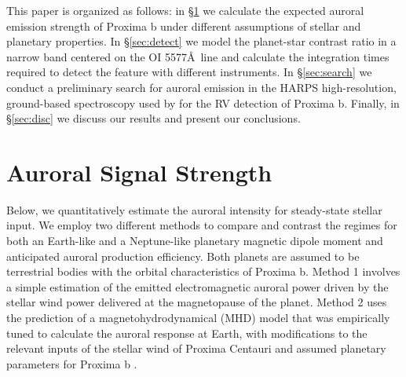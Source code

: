 \documentclass{emulateapj}
\begin{document}
This paper is organized as follows: in \S\ref{sec:signal} we calculate the expected auroral emission strength of Proxima b under different assumptions of stellar and planetary properties. In \S\ref{sec:detect} we model the planet-star contrast ratio in a narrow band centered on the OI 5577\AA\ line and calculate the integration times required to detect the feature with different instruments. In \S\ref{sec:search} we conduct a preliminary search for auroral emission in the HARPS high-resolution, ground-based spectroscopy used by \citet{Anglada-Escude2016} for the RV detection of Proxima b. Finally, in \S\ref{sec:disc} we discuss our results and present our conclusions.

%
%
%


\section{Auroral Signal Strength}
\label{sec:signal}

Below, we quantitatively estimate the auroral intensity for steady-state stellar input. We employ two different methods to compare and contrast the regimes for both an Earth-like and a Neptune-like planetary magnetic dipole moment and anticipated auroral production efficiency. Both planets are assumed to be terrestrial bodies with the orbital characteristics of Proxima b. Method 1 involves a simple estimation of the emitted electromagnetic auroral power driven by the stellar wind power delivered at the magnetopause of the planet. Method 2 uses the prediction of a magnetohydrodynamical (MHD) model that was empirically tuned to calculate the auroral response at Earth, with modifications to the relevant inputs of the stellar wind of Proxima Centauri and assumed planetary parameters for Proxima b \citep{Anglada-Escude2016}. 
\end{document}

